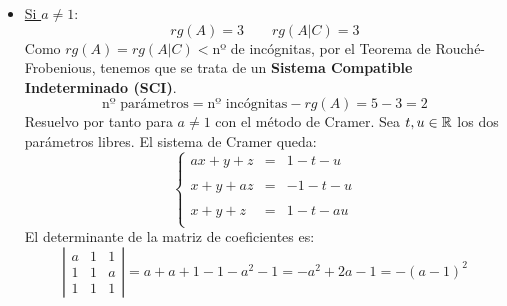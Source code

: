 \documentclass[12pt]{article}
\begin{document}
\begin{ejercicio}
\begin{itemize}
        \item \underline{Si $a\neq 1$}:
        \begin{equation*}
            rg(A)=3 \qquad rg(A|C)=3
        \end{equation*}
        Como $rg(A)=rg(A|C)<$nº de incógnitas, por el Teorema de Rouché-Frobenious, tenemos que se trata de un \textbf{Sistema Compatible Indeterminado (SCI)}.
        \begin{equation*}
            \text{nº parámetros} = \text{nº incógnitas} - rg(A)=5-3=2
        \end{equation*}
        Resuelvo por tanto para $a\neq 1$ con el método de Cramer. Sea $t,u\in \mathbb{R}$ los dos parámetros libres. El sistema de Cramer queda:
        $$
            \left\{
            \begin{array}{rcl}
                ax + y + z &=& 1 -t-u \\
                \\
                x + y + az &=& -1-t-u  \\
                \\
                x + y + z &=& 1 -t-au  \\
            \end{array}
            \right.
        $$
        El determinante de la matriz de coeficientes es:
        \begin{equation*}
            \left|\begin{array}{ccc}
                a & 1 & 1 \\
                1 & 1 & a \\
                1 & 1 & 1
            \end{array}\right| = a + a +1-1-a^2-1 = -a^2+2a-1 = -(a-1)^2
        \end{equation*}


\end{itemize}
\end{ejercicio}
\end{document}
